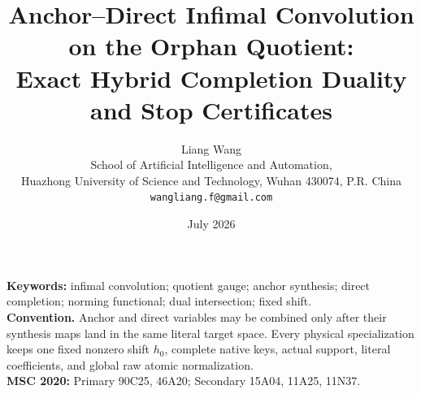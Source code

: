 \documentclass[11pt]{article}
\title{Anchor--Direct Infimal Convolution on the Orphan Quotient:\\
Exact Hybrid Completion Duality and Stop Certificates}
\author{Liang Wang\\
School of Artificial Intelligence and Automation,\\
Huazhong University of Science and Technology, Wuhan 430074, P.R. China\\
\texttt{wangliang.f@gmail.com}}
\date{July 2026}
\theoremstyle{remark}
\begin{document}
\maketitle


\noindent\textbf{Keywords:} infimal convolution; quotient gauge; anchor
synthesis; direct completion; norming functional; dual intersection;
fixed shift.\\[0.5em]
\noindent\textbf{Convention.} Anchor and direct variables may be
combined only after their synthesis maps land in the same literal
target space.  Every physical specialization keeps one fixed nonzero
shift \(h_0\), complete native keys, actual support, literal
coefficients, and global raw atomic normalization.\\[0.5em]
\noindent\textbf{MSC 2020:} Primary 90C25, 46A20; Secondary 15A04,
11A25, 11N37.












\begingroup
\small
\raggedright


\endgroup
\end{document}
